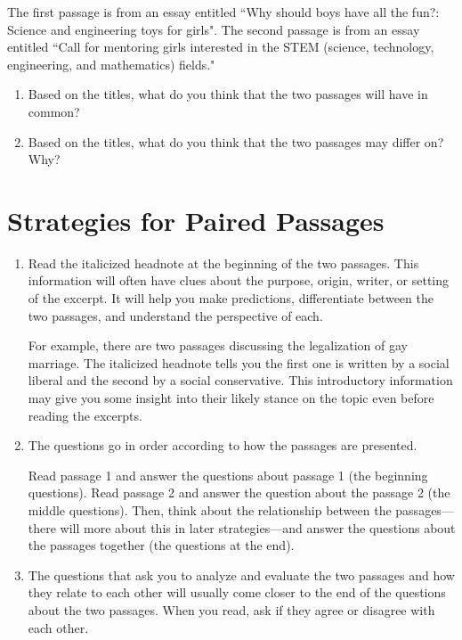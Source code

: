 \documentclass[12pt]{book}
\begin{document}
The first passage is from an essay entitled ``Why should boys have all the fun?: Science and engineering toys for girls". The second passage is from an essay entitled ``Call for mentoring girls interested in the STEM (science, technology, engineering, and mathematics) fields."

\begin{enumerate}
\item Based on the titles, what do you think that the two passages will have in common?

\hrulefill
\item Based on the titles, what do you think that the two passages may differ on? Why?

\hrulefill
\end{enumerate}

\vfill
\newpage
\section[Strategies]{Strategies for Paired Passages}

\begin{enumerate}[leftmargin=0cm,labelwidth=\itemindent,labelsep=0cm,align=left,label={\bfseries Strategy \#\arabic*:\ }]
\item Read the italicized headnote at the beginning of the two passages.  This information will often have clues about the purpose, origin, writer, or setting of the excerpt.  It will help you make predictions, differentiate between the two passages, and understand the perspective of each.

\bigskip
For example, there are two passages discussing the legalization of gay marriage.  The italicized headnote tells you the first one is written by a social liberal and the second by a social conservative.  This introductory information may give you some insight into their likely stance on the topic even before reading the excerpts.  

\item The questions go in order according to how the passages are presented. 

\bigskip
Read passage 1 and answer the questions about passage 1 (the beginning questions). Read passage 2 and answer the question about the passage 2 (the middle questions). Then, think about the relationship between the passages—there will more about this in later strategies—and answer the questions about the passages together (the questions at the end).

\item The questions that ask you to analyze and evaluate the two passages and how they relate to each other will usually come closer to the end of the questions about the two passages.  When you read, ask if they agree or disagree with each other.  
\end{enumerate}
\end{document}
